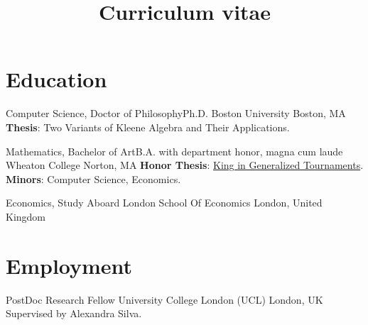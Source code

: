 \documentclass[10pt]{moderncv}        %
\title{Curriculum vitae}
\let\oldsection=\section
\renewcommand{\section}{%
  \needspace{\baselineskip}
  \oldsection
}
\begin{document}

\makecvtitle{}

\setlength{\parskip}{2.5px}
\linespread{1.3}
\selectfont


\section{Education}

{Computer Science, \iftechnical Doctor of Philosophy\else Ph.D.\fi} {}
{Boston University}
{Boston, MA}
{\textbf{Thesis}: Two Variants of Kleene Algebra and Their Applications.}  %





{Mathematics, \iftechnical Bachelor of Art\else B.A.\fi} {with department honor, magna cum laude}
{Wheaton College}
{Norton, MA}
{\textbf{Honor Thesis}: \href{http://hdl.handle.net/11040/24570}{King in Generalized Tournaments}.\\
\textbf{Minors}: Computer Science, Economics.
}

{Economics, Study Aboard} {}
{London School Of Economics}
{London, United Kingdom}
{}  %

\section{Employment}

{PostDoc Research Fellow}
{University College London (UCL)}
{London, UK}{}
{Supervised by Alexandra Silva.}
\end{document}
